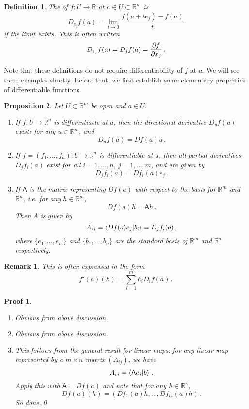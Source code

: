 \documentclass{article}
\theoremstyle{plain}\theoremheaderfont{\normalfont\itshape}\theorembodyfont{\rmfamily}\theoremseparator{.}\newtheorem*{rem}{Remark}\newtheorem*{ex}{Example}\newtheorem*{proof}{Proof}\newtheorem*{altp}{Alternative proof}
\theoremstyle{plain}\theoremheaderfont{\normalfont\bfseries}\theorembodyfont{\rmfamily}\theoremseparator{.}\newtheorem{thm}{Theorem}[section]\newtheorem{lem}[thm]{Lemma}\newtheorem{prop}[thm]{Proposition}\newtheorem*{cor}{Corollary}\newtheorem{defn}[thm]{Definition}\newtheorem{clm}[thm]{Claim}\newtheorem{clminproof}{Claim}
\theoremstyle{break}\theoremheaderfont{\normalfont\itshape}\theorembodyfont{\rmfamily}\theoremseparator{.\medskip}\newtheorem*{proofskip}{Proof}\newtheorem*{exs}{Examples}\newtheorem*{rems}{Remarks}
\theoremstyle{break}\theoremheaderfont{\normalfont\bfseries}\theorembodyfont{\rmfamily}\theoremseparator{.\medskip}\newtheorem{lemskip}[thm]{Lemma}\newtheorem{defnskip}[thm]{Definition}\newtheorem{propskip}[thm]{Proposition}\newtheorem{thmskip}[thm]{Theorem}
\newcommand{\qed}{\hfill\ensuremath{\Box}}
\begin{document}
    \begin{defn}
        The  of \(f:U\to\mathbb{R}\) at \(a\in U\subset\mathbb{R}^m\) is
        \[D_{e_j}f(a)=\lim_{t\to 0}\frac{f(a+te_j)-f(a)}{t}\]
        if the limit exists. This is often written
        \[D_{e_j}f(a)=D_jf(a)=\pdv{f}{x_j}(a)\,.\]
    \end{defn}

    Note that these definitions do not require differentiability of \(f\) at \(a\). We will see some examples shortly. Before that, we first establish some elementary properties of differentiable functions.

    \begin{prop}
        Let \(U\subset\mathbb{R}^m\) be open and \(a\in U\).
        \begin{enumerate}[label=(\roman*),topsep=0pt]
            \item If \(f:U\to\mathbb{R}^n\) is differentiable at \(a\), then the directional derivative \(D_u f(a)\) exists for any \(u\in\mathbb{R}^m\), and
            \[D_uf(a)=Df(a)u\,.\]
            \item If \(f=(f_1,\dots,f_n):U\to\mathbb{R}^n\) is differentiable at \(a\), then all partial derivatives \(D_jf_i(a)\) exist for all \(i=1,\dots,n\), \(j=1,\dots,m\), and are given by
            \[D_jf_i(a)=Df_i(a)e_j\,.\]
            \item If \(\mathsf{A}\) is the matrix representing \(Df(a)\) with respect to the basis for \(\mathbb{R}^m\) and \(\mathbb{R}^n\), i.e. for any \(h\in\mathbb{R}^m\),
            \[Df(a)h=\mathsf{A}h\,.\]
            Then \(A\) is given by
            \[A_{ij}=\braket{Df(a)e_j}{b_i}=D_jf_i(a)\,,\]
            where \(\{e_1,\dots,e_m\}\) and \(\{b_1,\dots,b_n\}\) are the standard basis of \(\mathbb{R}^m\) and \(\mathbb{R}^n\) respectively.
        \end{enumerate}
    \end{prop}
    \begin{rem}
        This is often expressed in the form
        \[f'(a)(h)=\sum_{i=1}^{m}h_iD_if(a)\,.\]
    \end{rem}
    \begin{proofskip}
        \begin{enumerate}[label=(\roman*),topsep=0pt]
            \item Obvious from above discussion.
            \item Obvious from above discussion.
            \item This follows from the general result for linear maps: for any linear map represented by a \(m\times n\) matrix \((A_{ij})\), we have
            \[A_{ij}=\braket{\mathsf{A}e_j}{b}\,.\]
            Apply this with \(\mathsf{A}=Df(a)\) and note that for any \(h\in\mathbb{R}^n\),
            \[Df(a)(h)=(Df_1(a)h,\dots,Df_m(a)h)\,.\]
            So done.\qed
        \end{enumerate}
    \end{proofskip}
\end{document}
